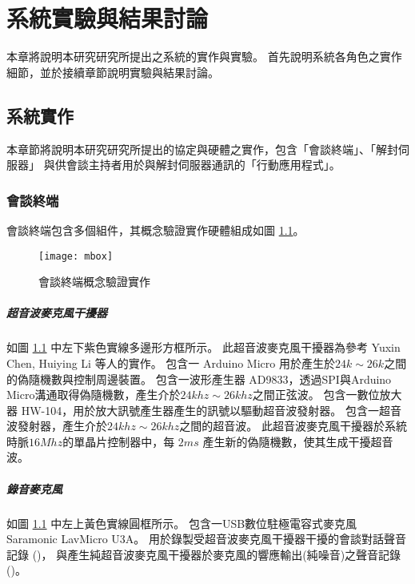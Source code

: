 \chapter{系統實驗與結果討論}\label{chapter:exp}

    本章將說明本研究研究所提出之系統的實作與實驗。
首先說明系統各角色之實作細節，並於接續章節說明實驗與結果討論。


\section{系統實作}\label{sec:impl}

    本章節將說明本研究研究所提出的協定與硬體之實作，包含「會談終端」、「解封伺服器」
與供會談主持者用於與解封伺服器通訊的「行動應用程式」。


\subsection{會談終端}\label{subsec:impl-mbox}

    會談終端包含多個組件，其概念驗證實作硬體組成如圖 \ref{fig:mbox}。

\begin{figure}[H]
    \centering
    \texttt{[image: mbox]}
    \caption{會談終端概念驗證實作}\label{fig:mbox}
\end{figure}


\paragraph{超音波麥克風干擾器}

    如圖 \ref{fig:mbox} 中左下紫色實線多邊形方框所示。
此超音波麥克風干擾器為參考 Yuxin Chen, Huiying Li 等人的實作\cite{chen2020wearable}。
包含一 Arduino Micro 用於產生於$24k\sim26k$之間的偽隨機數與控制周邊裝置。
包含一波形產生器 AD9833，透過SPI與Arduino Micro溝通取得偽隨機數，產生介於$24khz\sim26khz$之間正弦波。
包含一數位放大器 HW-104，用於放大訊號產生器產生的訊號以驅動超音波發射器。
包含一超音波發射器，產生介於$24khz\sim26khz$之間的超音波。
此超音波麥克風干擾器於系統時脈$16Mhz$的單晶片控制器中，每 $2ms$ 產生新的偽隨機數，使其生成干擾超音波。

\paragraph{錄音麥克風}

    如圖 \ref{fig:mbox} 中左上黃色實線圓框所示。
包含一USB數位駐極電容式麥克風 Saramonic LavMicro U3A。
用於錄製受超音波麥克風干擾器干擾的會談對話聲音記錄 (\DEFrecJ)，
與產生純超音波麥克風干擾器於麥克風的響應輸出(純噪音)之聲音記錄 (\DEFrecN)。

